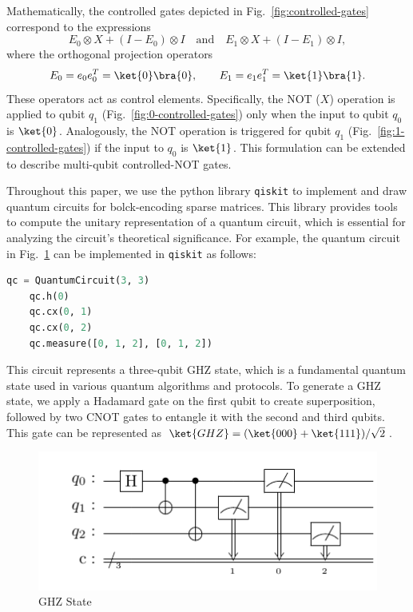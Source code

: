 \documentclass{article}
\begin{document}
Mathematically, the controlled gates depicted in Fig.~\ref{fig:controlled-gates} correspond to the expressions
\begin{equation}
  E_0 \otimes X + (I - E_0) \otimes I \quad \text{and} \quad E_1 \otimes X + (I - E_1) \otimes I,
\end{equation}
where the orthogonal projection operators
\begin{equation}
  E_0 = e_0 e_0^T = \ket{0} \bra{0}, \qquad E_1 = e_1 e_1^T = \ket{1}\bra{1}.
\end{equation}
These operators act as control elements.
Specifically, the NOT ($X$) operation is applied to qubit $q_1$ (Fig.~\ref{fig:0-controlled-gates}) only when the input to qubit $q_0$ is $\ket{0}$. Analogously, the NOT operation is triggered for qubit $q_1$ (Fig.~\ref{fig:1-controlled-gates}) if the input to $q_0$ is $\ket{1}$.
This formulation can be extended to describe multi-qubit controlled-NOT gates.

Throughout this paper, we use the python library \texttt{qiskit} \cite{wille2019ibm} to implement and draw quantum circuits for bolck-encoding sparse matrices.
This library provides tools to compute the unitary representation of a quantum circuit, which is essential for analyzing the circuit's theoretical significance.
For example, the quantum circuit in Fig.~\ref{fig:circuit1} can be implemented in \texttt{qiskit} as follows:

    \begin{lstlisting}[language=Python, label={lst:ghz-circuit}]
    qc = QuantumCircuit(3, 3)
    qc.h(0)
    qc.cx(0, 1)
    qc.cx(0, 2)
    qc.measure([0, 1, 2], [0, 1, 2])
    \end{lstlisting}

This circuit represents a three-qubit GHZ state, which is a fundamental quantum state used in various quantum algorithms and protocols.
To generate a GHZ state, we apply a Hadamard gate on the first qubit to create superposition, followed by two CNOT gates to entangle it with the second and third qubits.
This gate can be represented as $\ket{GHZ} = (\ket{000}+\ket{111})/\sqrt{2}$.

\begin{figure}[htbp]
  \centering
  \includegraphics{pdf/example}
  \caption{
    GHZ State
  }
  \label{fig:circuit1}
\end{figure}
\end{document}
